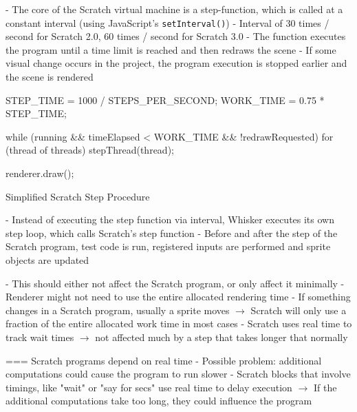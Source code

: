 - The core of the Scratch virtual machine is a step-function, which is called at a constant interval (using JavaScript's \texttt{setInterval()})
- Interval of 30 times / second for Scratch 2.0, 60 times / second for Scratch 3.0
- The function executes the program until a time limit is reached and then redraws the scene
- If some visual change occurs in the project, the program execution is stopped earlier and the scene is rendered

\begin{listing}[ht]
    \centering
    \begin{javascriptcode}
        STEP_TIME = 1000 / STEPS_PER_SECOND;
        WORK_TIME = 0.75 * STEP_TIME;

        while (running &&
               timeElapsed < WORK_TIME &&
               !redrawRequested) {
            for (thread of threads) {
                stepThread(thread);
            }
        }

        renderer.draw();
    \end{javascriptcode}
    \vspace{-\bigskipamount}
    \caption{Simplified Scratch Step Procedure}
    \label{fig:simplified_scratch_step_procedure}
\end{listing}

- Instead of executing the step function via interval, Whisker executes its own step loop, which calls Scratch's step function
- Before and after the step of the Scratch program, test code is run, registered inputs are performed and sprite objects are updated

- This should either not affect the Scratch program, or only affect it minimally
    - Renderer might not need to use the entire allocated rendering time
    - If something changes in a Scratch program, usually a sprite moves $\rightarrow$ Scratch will only use a fraction of the entire allocated work time in most cases
    - Scratch uses real time to track wait times $\rightarrow$ not affected much by a step that takes longer that normally

=== Scratch programs depend on real time
- Possible problem: additional computations could cause the program to run slower
- Scratch blocks that involve timings, like "wait" or "say for secs" use real time to delay execution
$\rightarrow$ If the additional computations take too long, they could influence the program

